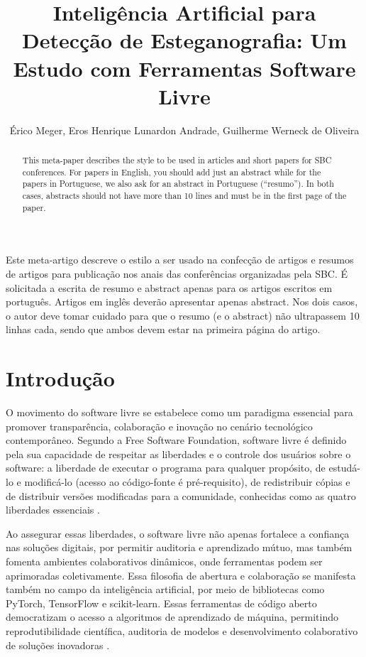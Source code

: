 \documentclass[12pt]{article}
\title{Inteligência Artificial para Detecção de Esteganografia: Um Estudo com Ferramentas Software Livre}
\author{Érico Meger\inst{1}, Eros Henrique Lunardon Andrade\inst{1}, Guilherme Werneck de Oliveira\inst{1}}
\begin{document}
\maketitle

\begin{abstract}
  This meta-paper describes the style to be used in articles and short papers
  for SBC conferences. For papers in English, you should add just an abstract
  while for the papers in Portuguese, we also ask for an abstract in
  Portuguese (``resumo''). In both cases, abstracts should not have more than
  10 lines and must be in the first page of the paper.
\end{abstract}

\begin{resumo}
  Este meta-artigo descreve o estilo a ser usado na confecção de artigos e
  resumos de artigos para publicação nos anais das conferências organizadas
  pela SBC. É solicitada a escrita de resumo e abstract apenas para os artigos
  escritos em português. Artigos em inglês deverão apresentar apenas abstract.
  Nos dois casos, o autor deve tomar cuidado para que o resumo (e o abstract)
  não ultrapassem 10 linhas cada, sendo que ambos devem estar na primeira
  página do artigo.
\end{resumo}

\section{Introdução}

O movimento do software livre se estabelece como um paradigma essencial para
promover transparência, colaboração e inovação no cenário tecnológico
contemporâneo. Segundo a Free Software Foundation, software livre é definido
pela sua capacidade de respeitar as liberdades e o controle dos usuários sobre
o software: a liberdade de executar o programa para qualquer propósito, de
estudá-lo e modificá-lo (acesso ao código-fonte é pré-requisito), de
redistribuir cópias e de distribuir versões modificadas para a comunidade,
conhecidas como as quatro liberdades essenciais \cite{gnu_freesw}.

Ao assegurar essas liberdades, o software livre não apenas fortalece a
confiança nas soluções digitais, por permitir auditoria e aprendizado mútuo,
mas também fomenta ambientes colaborativos dinâmicos, onde ferramentas podem
ser aprimoradas coletivamente. Essa filosofia de abertura e colaboração se
manifesta também no campo da inteligência artificial, por meio de bibliotecas
como PyTorch, TensorFlow e scikit-learn. Essas ferramentas de código aberto
democratizam o acesso a algoritmos de aprendizado de máquina, permitindo
reprodutibilidade científica, auditoria de modelos e desenvolvimento
colaborativo de soluções inovadoras \cite{pytorch_about, tensorflow_about}.
\end{document}
